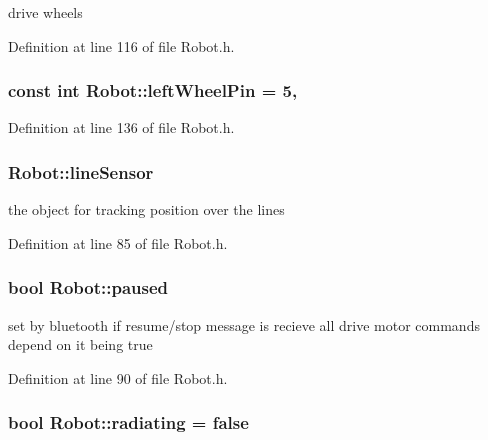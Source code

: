drive wheels 



Definition at line 116 of file Robot.\-h.

\hypertarget{classRobot_a46298d7fb4c8c3932221c6a5ac14af9d}{
\subsubsection[{left\-Wheel\-Pin}]{\setlength{\rightskip}{0pt plus 5cm}const int Robot\-::left\-Wheel\-Pin = 5\hspace{0.3cm}{\ttfamily [static]}, {\ttfamily [private]}}}\label{classRobot_a46298d7fb4c8c3932221c6a5ac14af9d}


Definition at line 136 of file Robot.\-h.

\hypertarget{classRobot_abdc300045bea9a31013b25682629752d}{
\subsubsection[{line\-Sensor}]{ Robot\-::line\-Sensor}}\label{classRobot_abdc300045bea9a31013b25682629752d}


the object for tracking position over the lines 



Definition at line 85 of file Robot.\-h.

\hypertarget{classRobot_a6a1fae6e6ee0a3298b9e60d3f50ad12a}{
\subsubsection[{paused}]{\setlength{\rightskip}{0pt plus 5cm}bool Robot\-::paused}}\label{classRobot_a6a1fae6e6ee0a3298b9e60d3f50ad12a}


set by bluetooth if resume/stop message is recieve all drive motor commands depend on it being true 



Definition at line 90 of file Robot.\-h.

\hypertarget{classRobot_a77f62d85ab1cf34e79c2a3acd470a4ce}{
\subsubsection[{radiating}]{\setlength{\rightskip}{0pt plus 5cm}bool Robot\-::radiating = false}}\label{classRobot_a77f62d85ab1cf34e79c2a3acd470a4ce}


